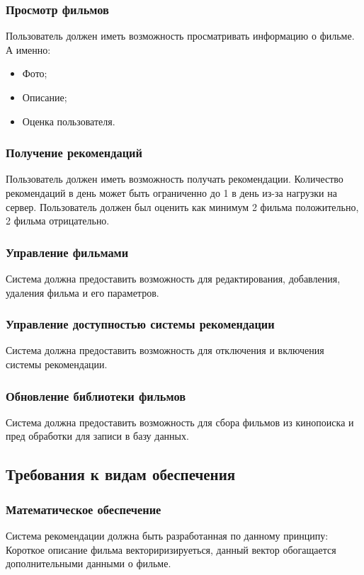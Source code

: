 \subsubsection{Просмотр фильмов}
Пользователь должен иметь возможность просматривать информацию о фильме.
А именно:
\begin{itemize}
    \item Фото;
    \item Описание;
    \item Оценка пользователя.
\end{itemize}

\subsubsection{Получение рекомендаций}
Пользователь должен иметь возможность получать рекомендации.
Количество рекомендаций в день может быть ограниченно до 1 в день из-за нагрузки на сервер.
Пользователь должен был оценить как минимум 2 фильма положительно, 2 фильма отрицательно.

\subsubsection{Управление фильмами}
Система должна предоставить возможность для редактирования, добавления, удаления фильма и его параметров.

\subsubsection{Управление доступностью системы рекомендации}
Система должна предоставить возможность для отключения и включения системы рекомендации.

\subsubsection{Обновление библиотеки фильмов}
Система должна предоставить возможность для сбора фильмов из кинопоиска и пред обработки для записи в базу данных.

\subsection{Требования к видам обеспечения}
\subsubsection{Математическое обеспечение}
Система рекомендации должна быть разработанная по данному принципу:
Короткое описание фильма векториризируеться, данный вектор обогащается дополнительными данными о фильме.

